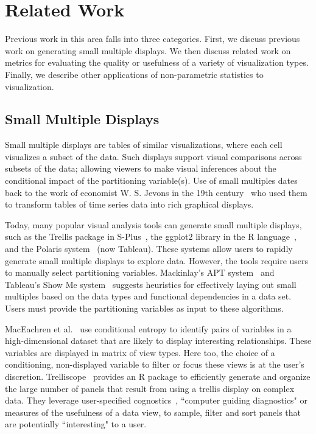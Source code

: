 \section{Related Work}
\label{sec:related}
Previous work in this area falls into three categories. First, we discuss previous work on generating small multiple displays. We then discuss related work on metrics for evaluating the quality or usefulness of a variety of visualization types. Finally, we describe other applications of non-parametric statistics to visualization.

\subsection{Small Multiple Displays}
Small multiple displays are tables of similar visualizations, where each cell visualizes a subset of the data. Such displays support visual comparisons across subsets of the data; allowing viewers to make visual inferences about the conditional impact of the partitioning variable(s). Use of small multiples dates back to the work of economist W. S. Jevons in the 19th century~\cite{Kelley1973} who used them to transform tables of time series data into rich graphical displays. 

Today, many popular visual analysis tools can generate small multiple displays, such as the Trellis package in S-Plus~\cite{Becker1996-manual}, the ggplot2 library in the R language~\cite{Wickham2006}, and the Polaris system~\cite{Stolte2002} (now Tableau). These systems allow users to rapidly generate small multiple displays to explore data. However, the tools require users to manually select partitioning variables. Mackinlay's APT system~\cite{mackinlay1986} and Tableau's Show Me system~\cite{mackinlay2007} suggests heuristics for effectively laying out small multiples based on the data types and functional dependencies in a data set. Users must provide the partitioning variables as input to these algorithms. 

MacEachren et al.~\cite{Maceachren2003} use conditional entropy to identify pairs of variables in a high-dimensional dataset that are likely to display interesting relationships. These variables are displayed in matrix of view types. Here too, the choice of a conditioning, non-displayed variable to filter or focus these views is at the user's discretion. Trelliscope~\cite{Hafen2013} provides an R package to efficiently generate and organize the large number of panels that result from using a trellis display on complex data. They leverage user-specified cognostics~\cite{Tukey1982}, ``computer guiding diagnostics" or measures of the usefulness of a data view, to sample, filter and sort panels that are potentially ``interesting" to a user. 


